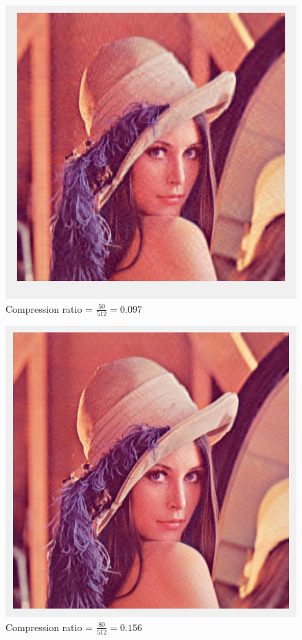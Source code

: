 \documentclass[11pt]{article}
\begin{document}
\begin{figure}[!h]
\centering
	\caption{Compression ratio = $\frac{50}{512} = 0.097$}
	\includegraphics[scale=.6]{lenna_50}
\end{figure}

\begin{figure}[!h]
\centering
	\caption{Compression ratio = $\frac{80}{512} = 0.156$}
	\includegraphics[scale=.6]{lenna_80}
\end{figure}
\end{document}
